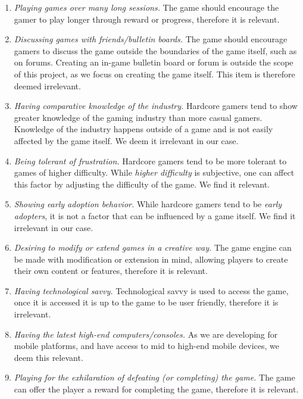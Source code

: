 \begin{enumerate}
\item \emph{Playing games over many long sessions.}
The game should encourage the gamer to play longer through reward or progress, therefore it is relevant.

\item \emph{Discussing games with friends/bulletin boards.}
The game should encourage gamers to discuss the game outside the boundaries of the game itself, such as on forums.
Creating an in-game bulletin board or forum is outside the scope of this project, as we focus on creating the game itself.
This item is therefore deemed irrelevant.

\item \emph{Having comparative knowledge of the industry.}
Hardcore gamers tend to show greater knowledge of the gaming industry than more casual gamers.
Knowledge of the industry happens outside of a game and is not easily affected by the game itself.
We deem it irrelevant in our case.

\item \emph{Being tolerant of frustration.}
Hardcore gamers tend to be more tolerant to games of higher difficulty.
While \textit{higher difficulty} is subjective, one can affect this factor by adjusting the difficulty of the game.
We find it relevant.

\item \emph{Showing early adoption behavior.}
While hardcore gamers tend to be \textit{early adopters}, it is not a factor that can be influenced by a game itself.
We find it irrelevant in our case.

\item \emph{Desiring to modify or extend games in a creative way.}
The game engine can be made with modification or extension in mind, allowing players to create their own content or features, therefore it is relevant.

\item \emph{Having technological savvy.}
Technological savvy is used to access the game, once it is accessed it is up to the game to be user friendly, therefore it is irrelevant.

\item \emph{Having the latest high-end computers/consoles.}
As we are developing for mobile platforms, and have access to mid to high-end mobile devices, we deem this relevant.

\item \emph{Playing for the exhilaration of defeating (or completing) the game.}
The game can offer the player a reward for completing the game, therefore it is relevant.


\end{enumerate}
